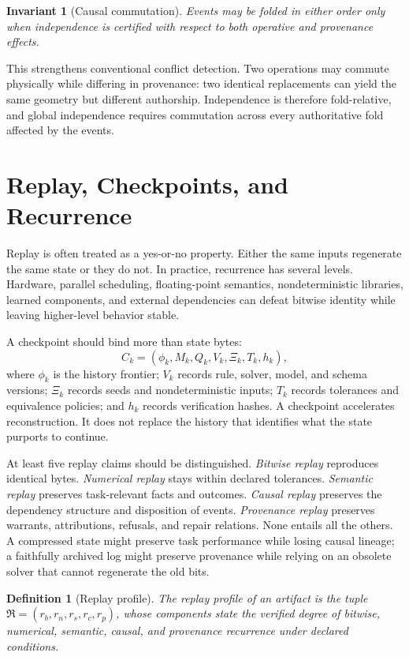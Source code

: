 \documentclass[11pt]{article}
\newtheorem{definition}{Definition}
\newtheorem{invariant}{Invariant}
\begin{document}
\begin{invariant}[Causal commutation]
Events may be folded in either order only when independence is certified with respect to both operative and provenance effects.
\end{invariant}

This strengthens conventional conflict detection. Two operations may commute physically while differing in provenance: two identical replacements can yield the same geometry but different authorship. Independence is therefore fold-relative, and global independence requires commutation across every authoritative fold affected by the events.

\section{Replay, Checkpoints, and Recurrence}

Replay is often treated as a yes-or-no property. Either the same inputs regenerate the same state or they do not. In practice, recurrence has several levels. Hardware, parallel scheduling, floating-point semantics, nondeterministic libraries, learned components, and external dependencies can defeat bitwise identity while leaving higher-level behavior stable.

A checkpoint should bind more than state bytes:
\[
C_k=(\phi_k,M_k,Q_k,V_k,\Xi_k,T_k,h_k),
\]
where $\phi_k$ is the history frontier; $V_k$ records rule, solver, model, and schema versions; $\Xi_k$ records seeds and nondeterministic inputs; $T_k$ records tolerances and equivalence policies; and $h_k$ records verification hashes. A checkpoint accelerates reconstruction. It does not replace the history that identifies what the state purports to continue.

At least five replay claims should be distinguished. \emph{Bitwise replay} reproduces identical bytes. \emph{Numerical replay} stays within declared tolerances. \emph{Semantic replay} preserves task-relevant facts and outcomes. \emph{Causal replay} preserves the dependency structure and disposition of events. \emph{Provenance replay} preserves warrants, attributions, refusals, and repair relations. None entails all the others. A compressed state might preserve task performance while losing causal lineage; a faithfully archived log might preserve provenance while relying on an obsolete solver that cannot regenerate the old bits.

\begin{definition}[Replay profile]
The replay profile of an artifact is the tuple $\mathfrak{R}=(r_b,r_n,r_s,r_c,r_p)$, whose components state the verified degree of bitwise, numerical, semantic, causal, and provenance recurrence under declared conditions.
\end{definition}
\end{document}

